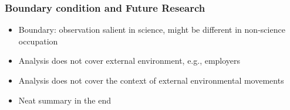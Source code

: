 \documentclass{article}
\begin{document}
	\subsubsection*{Boundary condition and Future Research}
	\begin{itemize}
		\item Boundary: observation salient in science, might be different in non-science occupation
		\item Analysis does not cover external environment, e.g., employers
		\item Analysis does not cover the context of external environmental movements
		\item Neat summary in the end
	\end{itemize}
	
\end{document}
